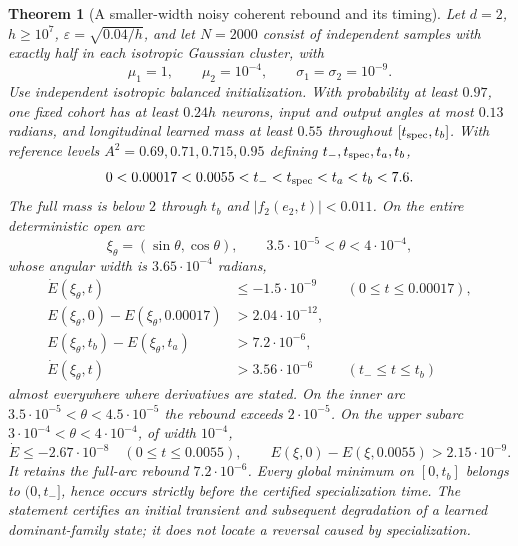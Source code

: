 \documentclass[11pt]{article}
\newtheorem{theorem}{Theorem}[section]
\theoremstyle{remark}
\begin{document}
\begin{theorem}[A smaller-width noisy coherent rebound and its timing]
\label{sbsharp:theorem}
Let $d=2$, $h\ge10^7$, $\varepsilon=\sqrt{0.04/h}$, and let $N=2000$
consist of independent samples with exactly half in each isotropic
Gaussian cluster, with
\[
 \mu_1=1,\qquad\mu_2=10^{-4},\qquad\sigma_1=\sigma_2=10^{-9}.
\]
Use independent isotropic balanced initialization. With probability at
least $0.97$, one fixed cohort has at least $0.24h$ neurons, input and
output angles at most $0.13$ radians, and longitudinal learned mass at
least $0.55$ throughout $[t_{\rm spec},t_b]$. With reference levels
$A^2=0.69,0.71,0.715,0.95$ defining $t_-,t_{\rm spec},t_a,t_b$,
\[
 0<0.00017<0.0055<t_-<t_{\rm spec}<t_a<t_b<7.6.
\]
The full mass is below $2$ through $t_b$ and $|f_2(e_2,t)|<0.011$.
On the entire deterministic open arc
\[
 \xi_\theta=(\sin\theta,\cos\theta),\qquad
 3.5\cdot10^{-5}<\theta<4\cdot10^{-4},
\]
whose angular width is $3.65\cdot10^{-4}$ radians,
\begin{align*}
 \dot E(\xi_\theta,t)&\le-1.5\cdot10^{-9}
                         &&(0\le t\le0.00017),\\
 E(\xi_\theta,0)-E(\xi_\theta,0.00017)&>2.04\cdot10^{-12},\\
 E(\xi_\theta,t_b)-E(\xi_\theta,t_a)&>7.2\cdot10^{-6},\\
 \dot E(\xi_\theta,t)&>3.56\cdot10^{-6}
                         &&(t_-\le t\le t_b)
\end{align*}
almost everywhere where derivatives are stated. On the inner arc
$3.5\cdot10^{-5}<\theta<4.5\cdot10^{-5}$ the rebound exceeds
$2\cdot10^{-5}$. On the upper subarc
$3\cdot10^{-4}<\theta<4\cdot10^{-4}$, of width $10^{-4}$,
\[
 \dot E\le-2.67\cdot10^{-8}\quad(0\le t\le0.0055),\qquad
 E(\xi,0)-E(\xi,0.0055)>2.15\cdot10^{-9}.
\]
It retains the full-arc rebound $7.2\cdot10^{-6}$.
Every global minimum
on $[0,t_b]$ belongs to $(0,t_-]$, hence occurs strictly before the
certified specialization time. The statement certifies an initial
transient and subsequent degradation of a learned dominant-family state;
it does not locate a reversal caused by specialization.
\end{theorem}
\end{document}
